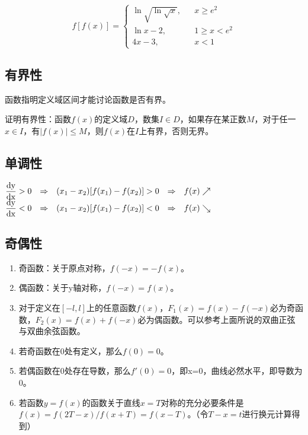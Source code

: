 \documentclass[UTF8, 12pt]{ctexart}
\begin{document}
$$
    f[f(x)]=\left\{
    \begin{array}{lcl}
        \ln\sqrt{\ln\sqrt{x}}, &  & x\geqslant e^2   \\
        \ln x-2,               &  & 1\geqslant x<e^2 \\
        4x-3,                  &  & x<1
    \end{array}
    \right.
$$

\subsection{有界性}

函数指明定义域区间才能讨论函数是否有界。

证明有界性：函数$f(x)$的定义域$D$，数集$I\in D$，如果存在某正数$M$，对于任一$x\in I$，有$\vert f(x)\vert\leqslant M$，则$f(x)$在$I$上有界，否则无界。

\subsection{单调性}

$\begin{matrix}
        \dfrac{\rm{d}y}{\rm{d}x}>0 & \Rightarrow & (x_1-x_2)[f(x_1)-f(x_2)]>0 & \Rightarrow & f(x)\nearrow \\
        \dfrac{\rm{d}y}{\rm{d}x}<0 & \Rightarrow & (x_1-x_2)[f(x_1)-f(x_2)]<0 & \Rightarrow & f(x)\searrow
    \end{matrix}
$

\subsection{奇偶性}

\begin{enumerate}
    \item 奇函数：关于原点对称，$f(-x)=-f(x)$。
    \item 偶函数：关于y轴对称，$f(-x)=f(x)$。
    \item 对于定义在$[-l,l]$上的任意函数$f(x)$，$F_1(x)=f(x)-f(-x)$必为奇函数，$F_2(x)=f(x)+f(-x)$必为偶函数。可以参考上面所说的双曲正弦与双曲余弦函数。
    \item 若奇函数在0处有定义，那么$f(0)=0$。
    \item 若偶函数在0处存在导数，那么$f'(0)=0$，即x=0，曲线必然水平，即导数为0。
    \item 若函数$y=f(x)$的函数关于直线$x=T$对称的充分必要条件是$f(x)=f(2T-x)/f(x+T)=f(x-T)$。（令$T-x=t$进行换元计算得到）
\end{enumerate}
\end{document}
